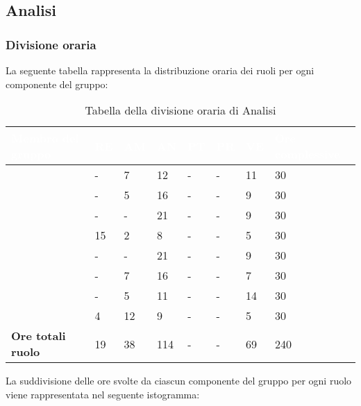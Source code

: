 \subsection{Analisi}

\subsubsection{Divisione oraria}
La seguente tabella rappresenta la distribuzione oraria dei ruoli per ogni componente del gruppo:
{
\renewcommand{\arraystretch}{2}
\begin{longtable}[h!] { C{4cm} C{1cm} C{1cm} C{1cm} C{1cm} C{1cm} C{1cm} C{3cm}}
\caption{Tabella della divisione oraria di Analisi}	\\

\textcolor{white}{\textbf{Membro del gruppo}} & 
\textcolor{white}{\textbf{RE}} & 
\textcolor{white}{\textbf{AM}} & 
\textcolor{white}{\textbf{AN}} & 
\textcolor{white}{\textbf{PT}} & 
\textcolor{white}{\textbf{PR}} & 
\textcolor{white}{\textbf{VE}} & 
\textcolor{white}{\textbf{Ore complessive}}\\	
\endhead

\MC{}                     &  - &  7 &  12 & - & - & 11 &  30 \\
\LD{}                     &  - &  5 &  16 & - & - &  9 &  30 \\
\CE{}                     &  - &  - &  21 & - & - &  9 &  30 \\
\SE{}                     & 15 &  2 &   8 & - & - &  5 &  30 \\
\PF{}                     &  - &  - &  21 & - & - &  9 &  30 \\
\DF{}                     &  - &  7 &  16 & - & - &  7 &  30 \\
\BR{}                     &  - &  5 &  11 & - & - & 14 &  30 \\
\AT{}                     &  4 & 12 &   9 & - & - &  5 &  30 \\
\textbf{Ore totali ruolo} & 19 & 38 & 114 & - & - & 69 & 240 \\

\end{longtable}
}
La suddivisione delle ore svolte da ciascun componente del gruppo per ogni ruolo viene rappresentata nel seguente istogramma:
